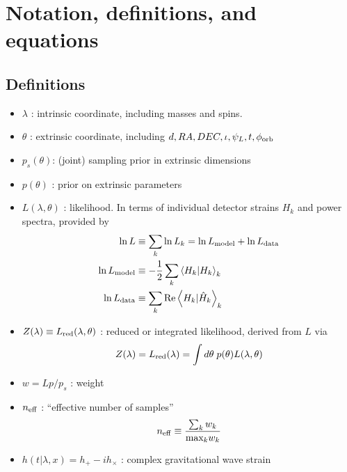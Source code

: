 \documentclass[twocolumn,prd,nofootinbib]{revtex4}
\newcommand\qmstateproduct[2]{\left\langle#1|#2\right\rangle}
\begin{document}
\appendix


\section{Notation, definitions, and equations}

\subsection{Definitions}
\begin{itemize}
\item $\lambda$ : intrinsic coordinate, including masses and spins.

\item $\theta$ : extrinsic coordinate, including $d,RA,DEC,\iota,\psi_L,t,\phi_{\rm orb}$

\item $p_s(\theta)$: (joint) sampling prior in extrinsic dimensions

\item $p(\theta)$ : prior on extrinsic parameters

\item $L(\lambda,\theta)$ : likelihood.  In terms of individual detector strains $H_k$ and power spectra, provided by
\begin{eqnarray}
\ln L &\equiv \sum_k \ln L_k  = \ln L_{\rm model} + \ln L_{\rm data} \\
\ln L_{\rm model} &\equiv -\frac{1}{2} \sum_k \qmstateproduct{H_k}{H_k}_k  \\
\ln L_{\rm data} &\equiv  \sum_k \text{Re} \qmstateproduct{H_k}{\hat{H}_k}_k 
\end{eqnarray}

\item $Z(\lambda) \equiv L_{\rm red}(\lambda,\theta)$ : reduced or integrated likelihood, derived from $L$ via
\begin{eqnarray}
Z(\lambda) = L_{\rm red}(\lambda) = \int d\theta \; p(\theta) L(\lambda,\theta)
\end{eqnarray}

\item 
$w=Lp/p_s$ : weight

\item 
$n_{\rm eff}$ : ``effective number of samples''
\begin{eqnarray}
n_{\rm eff} \equiv  \frac{\sum_k w_k}{\text{max}_k w_k}
\end{eqnarray}

\item 
$h(t|\lambda,x)=h_+-i h_\times$ : complex gravitational wave strain


\end{itemize}
\end{document}
